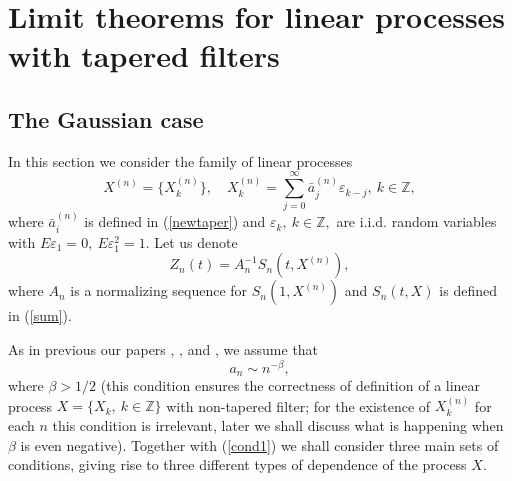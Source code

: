 \documentclass[12pt]{article}
\def\bz{{\bf Z}}
\def\bz{{\mathbb Z}} %
\def\a{\alpha}
\def\b{\beta}
\def\e{\varepsilon}
\def\l{\lambda}
\theoremstyle{plain}
\theoremstyle{definition}
\begin{document}
\section{Limit theorems for linear processes with tapered filters}\label{sec1}

\subsection{The Gaussian case}\label{subsec1}

In this section we consider the family of linear processes
$$%
X^{(n)}=\{X_k^{(n)} \}, \quad   X_k^{(n)}=\sum_{j=0}^\infty {\bar a}_j^{(n)}\e_{k-j}, \ k\in \bz,
$$%
where ${\bar a}_i^{(n)}$ is defined in (\ref{newtaper})
 and $\e_{k}, \ k\in \bz,$ are i.i.d. random variables with $E\e_1=0, \ E\e_1^2=1.$
  Let us denote
$$
Z_n(t)=A_n^{-1} S_n(t, X^{(n)} ),
$$
where $A_n$ is a normalizing sequence for $ S_n(1, X^{(n)})$ and $S_n(t, X)$ is defined in (\ref{sum}).

 As in previous our papers \cite{Paul21}, \cite{Paul22}, and \cite{PaulDam5}, we assume that
\begin{equation}\label{cond1}
a_n\sim n^{-\b},
\end{equation}
where $\b >1/2$ (this condition ensures the correctness of definition of a linear process $X=\{X_k, \ k\in \bz\}$ with non-tapered filter; for the existence of $X_k^{(n)}$ for each $n$ this condition is irrelevant, later we shall discuss what is happening when $\b$ is even negative). Together with (\ref{cond1}) we shall consider three main sets of conditions, giving rise to three different types of dependence of the process $X$.
\end{document}
